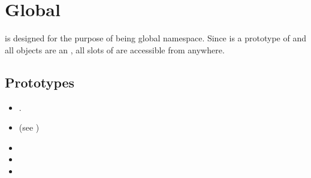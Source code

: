 
\section{Global}

 is designed for the purpose of being global
namespace. Since  is a prototype of  and all
objects are an , all slots of  are accessible from
anywhere.

\subsection{Prototypes}
\begin{itemize}
\item {}.
\item {} (see )
\item {}
\item {}
\item {}
\end{itemize}

